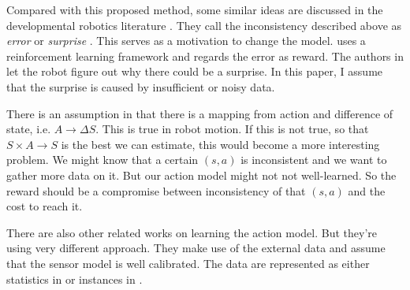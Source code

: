 \documentclass[10pt]{article}
\begin{document}
Compared with this proposed method, some similar ideas are discussed
in the developmental robotics literature \cite{oudeyer2006discovering,
schmidhuber2006developmental, ranasinghe2008surprise}. They call the
inconsistency described above as \textit{error}
\cite{oudeyer2006discovering} or \textit{surprise}
\cite{ranasinghe2008surprise}. This serves as a motivation to change
the model. \cite{oudeyer2006discovering} uses a reinforcement learning
framework and regards the error as reward. The authors in
\cite{ranasinghe2008surprise} let the robot figure out why there could
be a surprise. In this paper, I assume that the surprise is caused by
insufficient or noisy data.

There is an assumption in \cite{CSJ06} that there is a mapping from
action and difference of state, i.e. $A \rightarrow \Delta S$. This is
true in robot motion. If this is not true, so that $S \times A
\rightarrow S$ is the best we can estimate, this would become a more
interesting problem. We might know that a certain $(s, a)$ is
inconsistent and we want to gather more data on it. But our action
model might not not well-learned. So the reward should be a compromise
between inconsistency of that $(s, a)$ and the cost to reach it.

There are also other related works on learning the action model. But
they're using very different approach. They make use of the external
data and assume that the sensor model is well calibrated. The data are
represented as either statistics in \cite{And_learningand} or
instances in \cite{LNAI2007-ahmadi}.




\end{document}
